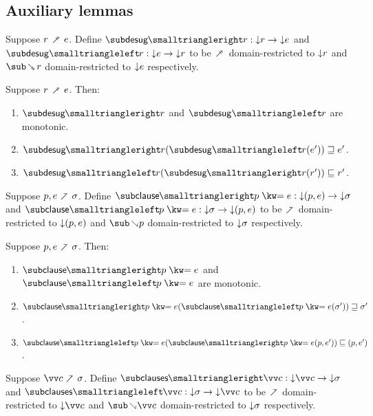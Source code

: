 \subsection{Auxiliary lemmas}

\begin{definition}
   Suppose $r \desugarFwdR e$. Define $\listRestFwdF{r}: \Below{r} \to \Below{e}$ and $\listRestBwdF{r}: \Below{e} \to \Below{r}$ to be $\desugarFwdR$ domain-restricted to ${\downarrow}{r}$ and $\desugarBwdR{r}$ domain-restricted to ${\downarrow}{e}$ respectively.
\end{definition}

\begin{lemma}
  \label{lem:aux:desugarlistrest:gc}
  Suppose $r \desugarFwdR e$. Then:
  \begin{enumerate}
     \item $\listRestFwdF{r}$ and $\listRestBwdF{r}$ are monotonic.
     \item $\listRestFwdF{r}(\listRestBwdF{r}(e')) \geq e'$.
     \item $\listRestBwdF{r}(\listRestFwdF{r}(r')) \leq r'$.
  \end{enumerate}
\end{lemma}

\begin{definition}
   Suppose $p, e \clauseFwd \sigma$. Define $\clauseFwdF{\clause{p}{e}}: \Below{(p,e)} \to \Below{\sigma}$ and $\clauseBwdF{\clause{p}{e}}: \Below{\sigma} \to \Below{(p,e)}$ to be $\clauseFwd$ domain-restricted to ${\downarrow}{(p,e)}$ and $\clauseBwd{p}$ domain-restricted to ${\downarrow}{\sigma}$ respectively.
\end{definition}

\begin{lemma}
  \label{lem:aux:clause:gc}
  Suppose $p, e \clauseFwd \sigma$. Then:
  \begin{enumerate}
     \item $\clauseFwdF{\clause{p}{e}}$ and $\clauseBwdF{\clause{p}{e}}$ are monotonic.
     \item $\clauseFwdF{\clause{p}{e}}(\clauseBwdF{\clause{p}{e}}(\sigma')) \geq \sigma'$.
     \item $\clauseBwdF{\clause{p}{e}}(\clauseFwdF{\clause{p}{e}}(p,e')) \leq (p,e')$.
  \end{enumerate}
\end{lemma}

\begin{definition}
   Suppose $\vec{c} \clauseFwd \sigma$. Define $\desugarClausesFwdF{\vec{c}}: \Below{\vec{c}} \to \Below{\sigma}$ and $\desugarClausesBwdF{\vec{c}}: \Below{\sigma} \to \Below{\vec{c}}$ to be $\clauseFwd$ domain-restricted to $\Below{\vec{c}}$ and $\clauseBwd{\vec{c}}$ domain-restricted to ${\downarrow}{\sigma}$ respectively.
\end{definition}

